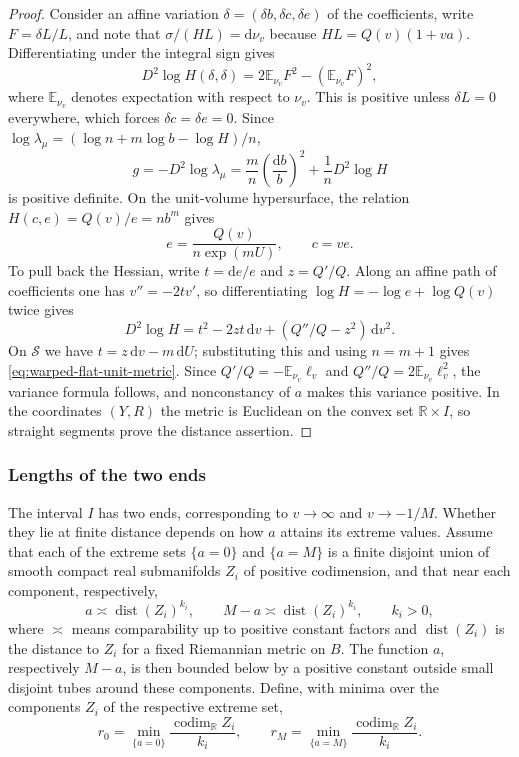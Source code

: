 \begin{proof}
Consider an affine variation $\delta=(\delta b,\delta c,\delta e)$ of the coefficients, write $F=\delta L/L$, and note that $\sigma/(HL)=\mathrm{d}\nu_v$ because $HL=Q(v)(1+va)$. Differentiating under the integral sign gives
\[
 D^2\log H(\delta,\delta)
   =2\mathbb E_{\nu_v} F^2-(\mathbb E_{\nu_v} F)^2,
\]
where $\mathbb E_{\nu_v}$ denotes expectation with respect to $\nu_v$. This is positive unless $\delta L=0$ everywhere, which forces $\delta c=\delta e=0$. Since $\log\lambda_\mu=(\log n+m\log b-\log H)/n$,
\[
 g=-D^2\log\lambda_\mu
   =\frac mn\left(\frac{\mathrm{d}b}{b}\right)^2
                  +\frac1nD^2\log H
\]
is positive definite. On the unit-volume hypersurface, the relation $H(c,e)=Q(v)/e=nb^m$ gives
\[
 e=\frac{Q(v)}{n\exp(mU)},\qquad c=ve.
\]
To pull back the Hessian, write $t=\mathrm{d}e/e$ and $z=Q'/Q$. Along an affine path of coefficients one has $v''=-2tv'$, so differentiating $\log H=-\log e+\log Q(v)$ twice gives
\[
 D^2\log H=t^2-2zt\,\mathrm{d}v
                   +(Q''/Q-z^2)\,\mathrm{d}v^2.
\]
On $\mathscr S$ we have $t=z\,\mathrm{d}v-m\,\mathrm{d}U$; substituting this and using $n=m+1$ gives \eqref{eq:warped-flat-unit-metric}. Since $Q'/Q=-\mathbb E_{\nu_v}\ell_v$ and $Q''/Q=2\mathbb E_{\nu_v}\ell_v^2$, the variance formula follows, and nonconstancy of $a$ makes this variance positive. In the coordinates $(Y,R)$ the metric is Euclidean on the convex set $\mathbb R\times I$, so straight segments prove the distance assertion.
\end{proof}

\subsubsection{Lengths of the two ends}

The interval $I$ has two ends, corresponding to $v\to\infty$ and $v\to-1/M$. Whether they lie at finite distance depends on how $a$ attains its extreme values. Assume that each of the extreme sets $\{a=0\}$ and $\{a=M\}$ is a finite disjoint union of smooth compact real submanifolds $Z_i$ of positive codimension, and that near each component, respectively,
\[
 a\asymp\operatorname{dist}(Z_i)^{k_i},\qquad
 M-a\asymp\operatorname{dist}(Z_i)^{k_i},\qquad k_i>0,
\]
where $\asymp$ means comparability up to positive constant factors and $\operatorname{dist}(Z_i)$ is the distance to $Z_i$ for a fixed Riemannian metric on $B$. The function $a$, respectively $M-a$, is then bounded below by a positive constant outside small disjoint tubes around these components. Define, with minima over the components $Z_i$ of the respective extreme set,
\[
 r_0=\min_{\{a=0\}}
       \frac{\operatorname{codim}_{\mathbb R}Z_i}{k_i},\qquad
 r_M=\min_{\{a=M\}}
       \frac{\operatorname{codim}_{\mathbb R}Z_i}{k_i}.
\]

